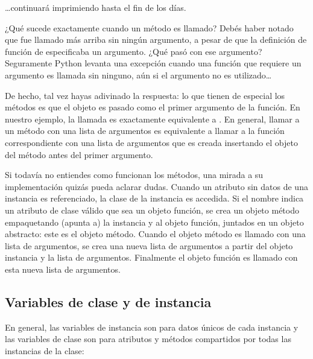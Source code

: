 \documentclass[a5paper,10pt,spanish]{sphinxmanual}
\begin{document}
\sphinxAtStartPar
…continuará imprimiendo  hasta el fin de los días.

\sphinxAtStartPar
¿Qué sucede exactamente cuando un método es llamado?  Debés haber notado que  fue llamado más arriba sin ningún argumento, a pesar de que la definición de función de  especificaba un argumento.  ¿Qué pasó con ese argumento?  Seguramente Python levanta una excepción cuando una función que requiere un argumento es llamada sin ninguno, aún si el argumento no es utilizado…

\sphinxAtStartPar
De hecho, tal vez hayas adivinado la respuesta: lo que tienen de especial los métodos es que el objeto es pasado como el primer argumento de la función. En nuestro ejemplo, la llamada  es exactamente equivalente a .  En general, llamar a un método con una lista de  argumentos es equivalente a llamar a la función correspondiente con una lista de argumentos que es creada insertando el objeto del método antes del primer argumento.

\sphinxAtStartPar
Si todavía no entiendes como funcionan los métodos, una mirada a su implementación quizás pueda aclarar dudas. Cuando un atributo sin datos de una instancia es referenciado, la clase de la instancia es accedida. Si el nombre indica un atributo de clase válido que sea un objeto función, se crea un objeto método empaquetando (apunta a) la instancia y al objeto función, juntados en un objeto abstracto: este es el objeto método. Cuando el objeto método es llamado con una lista de argumentos, se crea una nueva lista de argumentos a partir del objeto instancia y la lista de argumentos. Finalmente el objeto función es llamado con esta nueva lista de argumentos.


\subsection{Variables de clase y de instancia}
\label{\detokenize{tutorial/classes:class-and-instance-variables}}\label{\detokenize{tutorial/classes:tut-class-and-instance-variables}}
\sphinxAtStartPar
En general, las variables de instancia son para datos únicos de cada instancia y las variables de clase son para atributos y métodos compartidos por todas las instancias de la clase:
\end{document}
